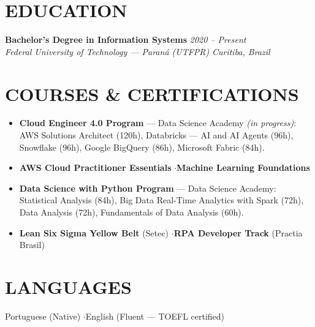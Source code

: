 \documentclass[11pt,a4paper]{article}
\begin{document}
\section{EDUCATION}
\noindent
\textbf{Bachelor's Degree in Information Systems} \hfill \textit{2020 -- Present} \\
\textit{Federal University of Technology --- Paraná (UTFPR)} \hfill \textit{Curitiba, Brazil}

\section{COURSES \& CERTIFICATIONS}
\begin{itemize}
    \item \textbf{Cloud Engineer 4.0 Program} --- Data Science Academy \textit{(in progress)}: AWS Solutions Architect (120h), Databricks --- AI and AI Agents (96h), Snowflake (96h), Google BigQuery (86h), Microsoft Fabric (84h).
    \item \textbf{AWS Cloud Practitioner Essentials} \enspace$\cdot$\enspace \textbf{Machine Learning Foundations}
    \item \textbf{Data Science with Python Program} --- Data Science Academy: Statistical Analysis (84h), Big Data Real-Time Analytics with Spark (72h), Data Analysis (72h), Fundamentals of Data Analysis (60h).
    \item \textbf{Lean Six Sigma Yellow Belt} (Setec) \enspace$\cdot$\enspace \textbf{RPA Developer Track} (Practia Brasil)
\end{itemize}

\section{LANGUAGES}
\noindent Portuguese (Native) \enspace$\cdot$\enspace English (Fluent --- TOEFL certified)
\end{document}
